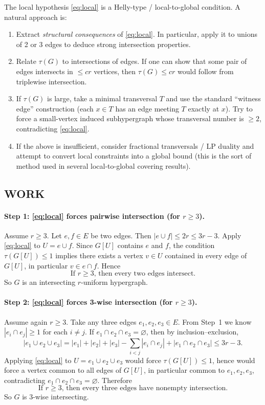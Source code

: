 The local hypothesis \eqref{eq:local} is a Helly-type / local-to-global condition. A natural approach is:
\begin{enumerate}[label=(\arabic*),leftmargin=2.5em]
\item Extract \emph{structural consequences} of \eqref{eq:local}. In particular, apply it to unions of 2 or 3 edges to deduce strong intersection properties.
\item Relate $\tau(G)$ to intersections of edges. If one can show that some pair of edges intersects in $\le c r$ vertices, then $\tau(G)\le c r$ would follow from triplewise intersection.
\item If $\tau(G)$ is large, take a minimal transversal $T$ and use the standard ``witness edge'' construction (each $x\in T$ has an edge meeting $T$ exactly at $x$). Try to force a small-vertex induced subhypergraph whose transversal number is $\ge 2$, contradicting \eqref{eq:local}.
\item If the above is insufficient, consider fractional transversals / LP duality and attempt to convert local constraints into a global bound (this is the sort of method used in several local-to-global covering results).
\end{enumerate}

\subsection*{WORK}

\paragraph{Step 1: \eqref{eq:local} forces pairwise intersection (for $r\ge 3$).}
Assume $r\ge 3$. Let $e,f\in E$ be two edges. Then $|e\cup f|\le 2r\le 3r-3$. Apply \eqref{eq:local} to $U=e\cup f$. Since $G[U]$ contains $e$ and $f$, the condition $\tau(G[U])\le 1$ implies there exists a vertex $v\in U$ contained in every edge of $G[U]$, in particular $v\in e\cap f$. Hence
\[
\boxed{\text{If $r\ge 3$, then every two edges intersect.}}
\]
So $G$ is an intersecting $r$-uniform hypergraph.

\paragraph{Step 2: \eqref{eq:local} forces 3-wise intersection (for $r\ge 3$).}
Assume again $r\ge 3$. Take any three edges $e_1,e_2,e_3\in E$. From Step~1 we know $|e_i\cap e_j|\ge 1$ for each $i\ne j$.
If $e_1\cap e_2\cap e_3=\varnothing$, then by inclusion--exclusion,
\[
|e_1\cup e_2\cup e_3|
= |e_1|+|e_2|+|e_3| - \sum_{i<j}|e_i\cap e_j| + |e_1\cap e_2\cap e_3|
\le 3r - 3.
\]
Applying \eqref{eq:local} to $U=e_1\cup e_2\cup e_3$ would force $\tau(G[U])\le 1$, hence would force a vertex common to all edges of $G[U]$, in particular common to $e_1,e_2,e_3$, contradicting $e_1\cap e_2\cap e_3=\varnothing$.
Therefore
\[
\boxed{\text{If $r\ge 3$, then every three edges have nonempty intersection.}}
\]
So $G$ is 3-wise intersecting.

